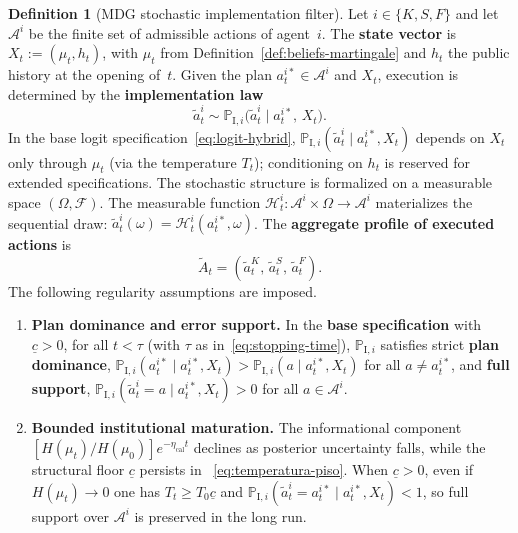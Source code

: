 \documentclass[ecta,nameyear,final,supplement]{econsocart}
\numberwithin{equation}{section}
\numberwithin{table}{section}
\theoremstyle{definition}
\newtheorem{definition}[theorem]{Definition}
\newcommand{\ProbI}[1]{\mathbb{P}_{\mathrm{I},#1}}
\begin{document}

\begin{definition}[MDG stochastic implementation filter]
\label{def:mano-dios-filtro}
Let $i\in\{K,S,F\}$ and let $\mathcal{A}^i$ be the finite set of admissible
actions of agent~$i$. The \textbf{state vector} is
$X_t:=(\mu_t,h_t)$, with $\mu_t$ from
Definition~\ref{def:beliefs-martingale} and $h_t$ the public history at the
opening of~$t$. Given the plan $a_t^{i\ast}\in\mathcal{A}^i$ and $X_t$,
execution is determined by the \textbf{implementation law}
\[
\tilde{a}_t^i \sim \ProbI{i}\bigl(\tilde{a}_t^i \mid a_t^{i\ast},\,X_t\bigr).
\]
In the base logit specification~\eqref{eq:logit-hybrid},
$\ProbI{i}(\tilde{a}_t^i\mid a_t^{i\ast},X_t)$ depends on $X_t$ only through $\mu_t$
(via the temperature $T_t$); conditioning on $h_t$ is reserved for extended
specifications. The stochastic structure is formalized on a measurable space
$(\Omega,\mathcal{F})$. The measurable function
$\mathcal{H}_t^i:\mathcal{A}^i\times\Omega\to\mathcal{A}^i$ materializes the
sequential draw: $\tilde{a}_t^i(\omega)=\mathcal{H}_t^i(a_t^{i\ast},\omega)$.
The \textbf{aggregate profile of executed actions} is
\begin{equation}
\label{eq:tilde-A-t}
\tilde{A}_t = (\tilde{a}_t^K,\,\tilde{a}_t^S,\,\tilde{a}_t^F).
\end{equation}
The following regularity assumptions are imposed.
\begin{enumerate}
  \item[\textup{(i)}] \textbf{Plan dominance and error support.}
  In the \textbf{base specification} with $\underline{c}>0$, for all
  $t<\tau$ (with $\tau$ as in~\eqref{eq:stopping-time}),
  $\ProbI{i}$ satisfies strict \textbf{plan dominance},
  $\ProbI{i}(a_t^{i\ast}\mid a_t^{i\ast},X_t)>\ProbI{i}(a\mid a_t^{i\ast},X_t)$
  for all $a\neq a_t^{i\ast}$, and \textbf{full support},
  $\ProbI{i}(\tilde{a}_t^i=a\mid a_t^{i\ast},X_t)>0$ for all
  $a\in\mathcal{A}^i$.
  \item[\textup{(ii)}] \textbf{Bounded institutional maturation.}
  The informational component
  $[H(\mu_t)/H(\mu_0)]e^{-\eta_{\mathrm{cal}}t}$ declines as posterior
  uncertainty falls, while the structural floor $\underline{c}$ persists in
  ~\eqref{eq:temperatura-piso}. When $\underline{c}>0$, even if
  $H(\mu_t)\to 0$ one has $T_t\ge T_0\underline{c}$ and
  $\ProbI{i}(\tilde{a}_t^i=a_t^{i\ast}\mid a_t^{i\ast},X_t)<1$, so full
  support over $\mathcal{A}^i$ is preserved in the long run.

\end{enumerate}
\end{definition}
\end{document}
